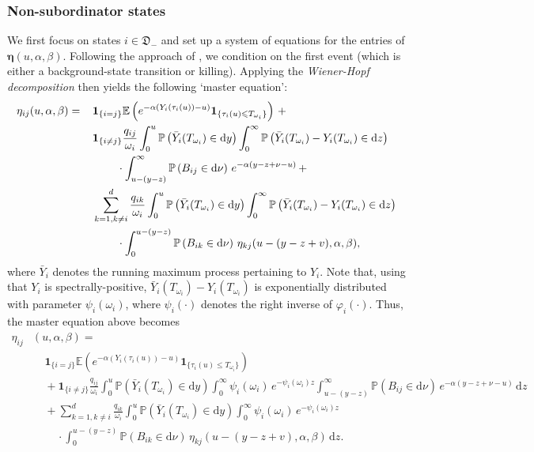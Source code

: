\documentclass[reqno,12pt]{amsart}
\newcommand{\bs}{\boldsymbol}
\newcommand{\defDmin}{{\mathfrak D}_-}
\begin{document}
\subsubsection*{Non-subordinator states}
We first focus on states $i\in\defDmin $ and set up a system of equations for the entries of $\bs\eta(u,\alpha,\beta)$. Following the approach of \cite[\S 1.3]{MB}, we condition on the first event (which is either a background-state transition or killing). Applying the {\it Wiener-Hopf decomposition} \cite[Chapter VI]{KYP} then yields the following `master equation':
\begin{align}\label{eq: master equation eta}
    \notag\eta_{ij}(u,\alpha,\beta) =
    \notag\:\:\:\:\: &{\bs 1}_{\{i=j\}}\mathbb{E}\left( e^{-\alpha(Y_i(\tau_i(u)) - u)}\bs{1}_{\{\tau_i(u) \leqslant T_{\omega_i}\}}\right)\,+ \\
    \notag\:\:\:\:\:\, &{\bs 1}_{\{i\neq j\}}\frac{q_{ij}}{\omega_i} \int_0^u  \mathbb{P}\left(\bar{Y}_i(T_{\omega_i})\in\mathrm{d}y\right) \int_{0}^\infty \mathbb{P}\left(\bar{Y}_i(T_{\omega_i})-Y_i(T_{\omega_i})\in\mathrm{d}z\right) \\
    \notag&\:\:\:\:\:\:\:\:\:\:\cdot\int_{u-(y-z)}^\infty \mathbb{P}\left(B_{ij}\in\mathrm{d}\nu\right)\,e^{-\alpha(y-z+\nu-u)}\,+\\
    \:\:\:\:\:& \sum_{k=1,k\neq i}^d \frac{q_{ik}}{\omega_i} \int_0^u  \mathbb{P}\left(\bar{Y}_i(T_{\omega_i})\in\mathrm{d}y\right) \int_{0}^\infty \mathbb{P}\left(\bar{Y}_i(T_{\omega_i})-Y_i(T_{\omega_i})\in\mathrm{d}z\right) \\
    \notag&\:\:\:\:\:\:\:\:\:\:\cdot\int_{0}^{u-(y-z)} \mathbb{P}\left(B_{ik}\in\mathrm{d}\nu\right)\,\eta_{kj}(u-(y-z+v), \alpha,\beta),
\end{align}
where $\bar{Y}_i$ denotes the running maximum process pertaining to $Y_i$. Note that, using that $Y_i$ is spectrally-positive, $\bar{Y}_i(T_{\omega_i})-Y_i(T_{\omega_i})$ is exponentially distributed with parameter $\psi_i(\omega_i)$, where $\psi_i(\cdot)$ denotes the right inverse of $\varphi_i(\cdot)$. Thus, the master equation above becomes
\begin{align*}
    \eta_{ij}&(u,\alpha,\beta) =\\
    &\:\:\:\:\: {\bs 1}_{\{i=j\}}\mathbb{E}\left( e^{-\alpha(Y_i(\tau_i(u)) - u)}\bs{1}_{\{\tau_i(u) \leqslant T_{\omega_i}\}}\right) \\
    &\:\:\:\:\:+ {\bs 1}_{\{i\neq j\}}\frac{q_{ij}}{\omega_i} \int_0^u  \mathbb{P}\left(\bar{Y}_i(T_{\omega_i})\in\mathrm{d}y\right) \int_{0}^\infty \psi_i(\omega_i)\,e^{-\psi_i(\omega_i) z} \int_{u-(y-z)}^\infty \mathbb{P}\left(B_{ij}\in\mathrm{d}\nu\right)\,e^{-\alpha(y-z+\nu-u)}\,{\mathrm d}z\\
    &\:\:\:\:\:+ \sum_{k=1,k\neq i}^d \frac{q_{ik}}{\omega_i} \int_0^u  \mathbb{P}\left(\bar{Y}_i(T_{\omega_i})\in\mathrm{d}y\right) \int_{0}^\infty \psi_i(\omega_i)\,e^{-\psi_i(\omega_i) z}\\
    & \:\:\:\:\:\:\:\:\:\:\cdot\int_{0}^{u-(y-z)} \mathbb{P}\left(B_{ik}\in\mathrm{d}\nu\right)\,\eta_{kj}(u-(y-z+v), \alpha,\beta)\,{\mathrm d}z.
\end{align*}
\end{document}
